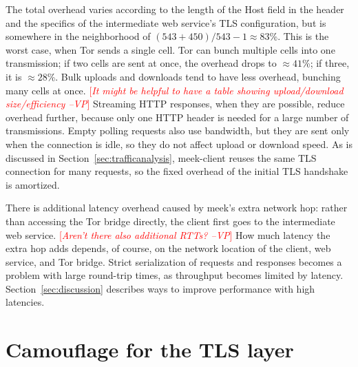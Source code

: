 \documentclass{sig-alternate}
\newcommand{\meekclient}{\mbox{meek-client}\xspace}
\newcommand{\note}[1]{{\textcolor{red}{[\textit{#1}]}}}
\newcommand{\vp}[1]{\note{#1 --VP}}
\begin{document}
\noindent
The total overhead varies according to the length
of the Host field in the header and the specifics of the intermediate web service's TLS configuration,
but is somewhere in the neighborhood of $(543+450)/543-1\approx83$\%.
This is the worst case, when Tor sends a single cell.
Tor can bunch multiple cells into one transmission;
if two cells are sent at once, the overhead drops to
${\approx}41$\%; if three, it is ${\approx}28$\%.
Bulk uploads and downloads tend to have less overhead, bunching many cells at once.
\vp{It might be helpful to have a table showing upload/download size/efficiency}
Streaming HTTP responses, when they are possible, reduce overhead further,
because only one HTTP header is needed for a large number of transmissions.
Empty polling requests also use bandwidth,
but they are sent only when the connection is idle,
so they do not affect upload or download speed.
As is discussed in Section~\ref{sec:trafficanalysis},
\meekclient reuses the same TLS connection for many requests,
so the fixed overhead of the initial TLS handshake is amortized.


There is additional latency overhead caused by meek's extra network hop:
rather than accessing the Tor bridge directly,
the client first goes to the intermediate web service.
\vp{Aren't there also additional RTTs?}
How much latency the extra hop adds depends, of course, on the network location
of the client, web service, and Tor bridge.
Strict serialization of requests and responses
becomes a problem with large round-trip times,
as throughput becomes limited by latency.
Section~\ref{sec:discussion} describes ways to improve
performance with high latencies.

\section{Camouflage for the TLS layer}
\label{sec:browserextension}
\end{document}
